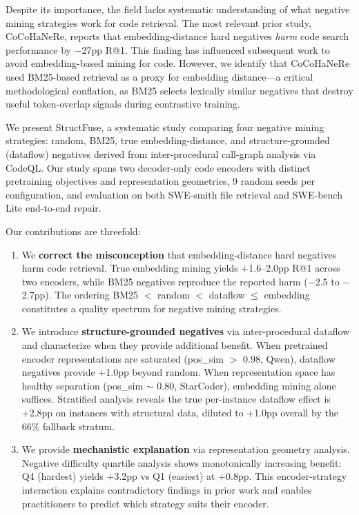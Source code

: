 \documentclass[11pt]{article}
\begin{document}
Despite its importance, the field lacks systematic understanding of what negative mining strategies work for code retrieval.
The most relevant prior study, CoCoHaNeRe, reports that embedding-distance hard negatives \emph{harm} code search performance by $-$27pp R@1.
This finding has influenced subsequent work to avoid embedding-based mining for code.
However, we identify that CoCoHaNeRe used BM25-based retrieval as a proxy for embedding distance---a critical methodological conflation, as BM25 selects lexically similar negatives that destroy useful token-overlap signals during contrastive training.

We present StructFuse, a systematic study comparing four negative mining strategies: random, BM25, true embedding-distance, and structure-grounded (dataflow) negatives derived from inter-procedural call-graph analysis via CodeQL.
Our study spans two decoder-only code encoders with distinct pretraining objectives and representation geometries, 9 random seeds per configuration, and evaluation on both SWE-smith file retrieval and SWE-bench Lite end-to-end repair.

Our contributions are threefold:

\begin{enumerate}
\item We \textbf{correct the misconception} that embedding-distance hard negatives harm code retrieval.
True embedding mining yields +1.6--2.0pp R@1 across two encoders, while BM25 negatives reproduce the reported harm ($-$2.5 to $-$2.7pp).
The ordering BM25 $<$ random $<$ dataflow $\leq$ embedding constitutes a quality spectrum for negative mining strategies.

\item We introduce \textbf{structure-grounded negatives} via inter-procedural dataflow and characterize when they provide additional benefit.
When pretrained encoder representations are saturated (pos\_sim $>$ 0.98, Qwen), dataflow negatives provide +1.0pp beyond random.
When representation space has healthy separation (pos\_sim $\sim$ 0.80, StarCoder), embedding mining alone suffices.
Stratified analysis reveals the true per-instance dataflow effect is +2.8pp on instances with structural data, diluted to +1.0pp overall by the 66\% fallback stratum.

\item We provide \textbf{mechanistic explanation} via representation geometry analysis.
Negative difficulty quartile analysis shows monotonically increasing benefit: Q4 (hardest) yields +3.2pp vs Q1 (easiest) at +0.8pp.
This encoder-strategy interaction explains contradictory findings in prior work and enables practitioners to predict which strategy suits their encoder.
\end{enumerate}
\end{document}
